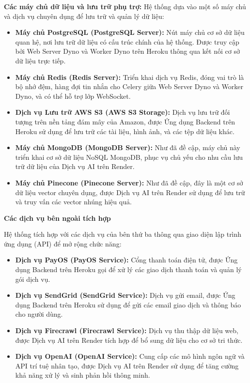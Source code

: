 \textbf{Các máy chủ dữ liệu và lưu trữ phụ trợ:} Hệ thống dựa vào một số máy chủ và dịch vụ chuyên dụng để lưu trữ và quản lý dữ liệu:
\begin{itemize}
    \item \textbf{Máy chủ PostgreSQL (PostgreSQL Server):} Nút máy chủ cơ sở dữ liệu quan hệ, nơi lưu trữ dữ liệu có cấu trúc chính của hệ thống. Được truy cập bởi Web Server Dyno và Worker Dyno trên Heroku thông qua kết nối cơ sở dữ liệu trực tiếp.
    \item \textbf{Máy chủ Redis (Redis Server):} Triển khai dịch vụ Redis, đóng vai trò là bộ nhớ đệm, hàng đợi tin nhắn cho Celery giữa Web Server Dyno và Worker Dyno, và có thể hỗ trợ lớp WebSocket.
    \item \textbf{Dịch vụ Lưu trữ AWS S3 (AWS S3 Storage):} Dịch vụ lưu trữ đối tượng trên nền tảng đám mây của Amazon, được Ứng dụng Backend trên Heroku sử dụng để lưu trữ các tài liệu, hình ảnh, và các tệp dữ liệu khác.
    \item \textbf{Máy chủ MongoDB (MongoDB Server):} Như đã đề cập, máy chủ này triển khai cơ sở dữ liệu NoSQL MongoDB, phục vụ chủ yếu cho nhu cầu lưu trữ dữ liệu của Dịch vụ AI trên Render.
    \item \textbf{Máy chủ Pinecone (Pinecone Server):} Như đã đề cập, đây là một cơ sở dữ liệu vector chuyên dụng, được Dịch vụ AI trên Render sử dụng để lưu trữ và truy vấn các vector nhúng hiệu quả.
\end{itemize}

\textbf{Các dịch vụ bên ngoài tích hợp}

Hệ thống tích hợp với các dịch vụ của bên thứ ba thông qua giao diện lập trình ứng dụng (API) để mở rộng chức năng:
\begin{itemize}
    \item \textbf{Dịch vụ PayOS (PayOS Service):} Cổng thanh toán điện tử, được Ứng dụng Backend trên Heroku gọi để xử lý các giao dịch thanh toán và quản lý gói dịch vụ.
    \item \textbf{Dịch vụ SendGrid (SendGrid Service):} Dịch vụ gửi email, được Ứng dụng Backend trên Heroku sử dụng để gửi các email giao dịch và thông báo cho người dùng.
    \item \textbf{Dịch vụ Firecrawl (Firecrawl Service):} Dịch vụ thu thập dữ liệu web, được Dịch vụ AI trên Render tích hợp để bổ sung dữ liệu cho cơ sở tri thức.
    \item \textbf{Dịch vụ OpenAI (OpenAI Service):} Cung cấp các mô hình ngôn ngữ và API trí tuệ nhân tạo, được Dịch vụ AI trên Render sử dụng để tăng cường khả năng xử lý và sinh phản hồi thông minh.
\end{itemize}
